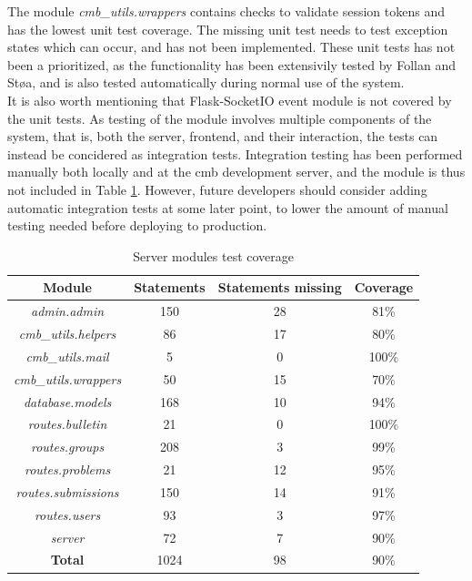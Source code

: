 The module \textit{cmb\_utils.wrappers} contains checks to validate session tokens and has the lowest unit test coverage. The missing unit test needs to test exception states which can occur, and has not been implemented. These unit tests has not been a prioritized, as the functionality has been extensivily tested by Follan and Støa, and is also tested automatically during normal use of the system. \\

It is also worth mentioning that Flask-SocketIO event module is not covered by the unit tests. As testing of the module involves multiple components of the system, that is, both the server, frontend, and their interaction, the tests can instead be concidered as integration tests. Integration testing has been performed manually both locally and at the \gls{cmb} development server, and the module is thus not included in Table \ref{tab:server-module-coverage}. However, future developers should consider adding automatic integration tests at some later point, to lower the amount of manual testing needed before deploying to production.

\begin{table}[h!]
    \centering
    \begin{tabular}{c c c c}
      \hline
      \textbf{Module} & \textbf{Statements} & \textbf{Statements missing} & \textbf{Coverage} \\ \hline
      \textit{admin.admin} & 150 & 28 & 81\% \\
      \textit{cmb\_utils.helpers} & 86 & 17 & 80\% \\
      \textit{cmb\_utils.mail} & 5 & 0 & 100\% \\
      \textit{cmb\_utils.wrappers} & 50 & 15 & 70\% \\
      \textit{database.models} & 168 & 10 & 94\% \\
      \textit{routes.bulletin} & 21 & 0 & 100\% \\
      \textit{routes.groups} & 208 & 3 & 99\% \\
      \textit{routes.problems} & 21 & 12 & 95\% \\
      \textit{routes.submissions} & 150 & 14 & 91\% \\
      \textit{routes.users} & 93 & 3 & 97\% \\
      \textit{server} & 72 & 7 & 90\% \\ \hline
      \textbf{Total} & 1024 & 98 & 90\% \\ \hline
    \end{tabular}
    \caption{Server modules test coverage}
    \label{tab:server-module-coverage}
\end{table}
